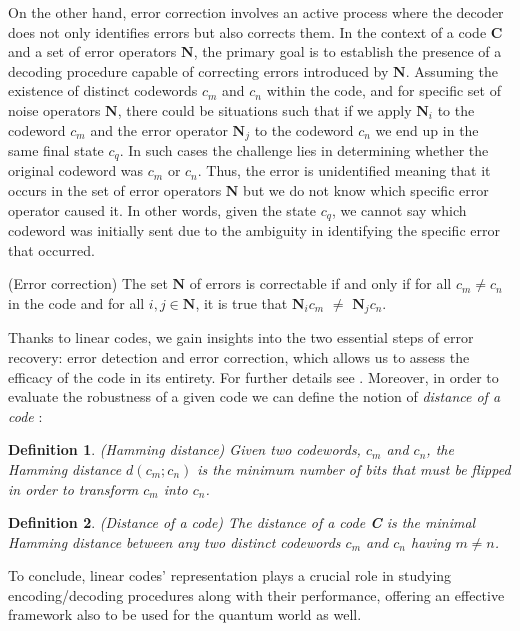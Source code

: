 \documentclass{Configuration_Files/PoliMi3i_thesis}
\newtheorem{definition}{Definition}[chapter]
\begin{document}
On the other hand, error correction involves an active process where the decoder does not only identifies errors but also corrects them. 
In the context of a code $\textbf{C}$ and a set of error operators $\textbf{N}$, the primary goal is to establish the presence of a decoding procedure capable of correcting errors introduced by $\textbf{N}$. 
Assuming the existence of distinct codewords $c_m$ and $c_n$ within the code, and for specific set of noise operators $\textbf{N}$, there could be situations such that if we apply $\textbf{N}_i$ to the codeword $c_m$ and the error operator $\textbf{N}_j$ to the codeword $c_n$ we end up in the same final state $c_q$. In such cases the challenge lies in determining whether the original codeword was $c_m$ or $c_n$. Thus, the error is unidentified meaning that it occurs in the set of error operators $\textbf{N}$ but we do not know which specific error operator caused it. In other words, given the state $c_q$, we cannot say which codeword was initially sent due to the ambiguity in identifying the specific error that occurred.

\begin{theorem}(Error correction)
	The set $\textbf{N}$ of errors is correctable if and only if for all $c_m \neq c_n$ in the code and for all $i, j \in \textbf{N}$, it is true that $\textbf{N}_ic_m$ $\neq$ $\textbf{N}_jc_n$. 
\end{theorem} 

Thanks to linear codes, we gain insights into the two essential steps of error recovery: error detection and error correction, which allows us to assess the efficacy of the code in its entirety. For further details see \cite{Kas19}. Moreover, in order to evaluate the robustness of a given code we can define the notion of {\it distance of a code} :


\begin{definition}(Hamming distance)
	Given two codewords, $c_m$ and $c_n$, the Hamming distance $d(c_m; c_n)$ is the minimum number of bits that must be flipped in order to transform $c_m$ into $c_n$.
\end{definition}


\begin{definition}(Distance of a code)
	The distance of a code {\bf C } is the minimal Hamming distance between any two distinct codewords $c_m$ and $c_n$ having $m \neq n$.
\end{definition}
	
To conclude, linear codes' representation plays a crucial role in studying encoding/decoding procedures along with their performance, offering an effective framework also to be used for the quantum world as well.
\end{document}
